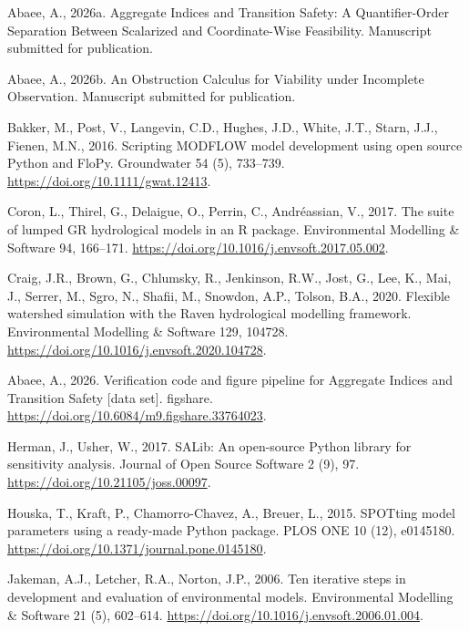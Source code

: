 \documentclass[3p,11pt]{elsarticle}
\begin{document}

\begin{thebibliography}{}
\providecommand{\natexlab}[1]{#1}

Abaee, A., 2026a. Aggregate Indices and Transition Safety: A Quantifier-Order
Separation Between Scalarized and Coordinate-Wise Feasibility. Manuscript
submitted for publication.

Abaee, A., 2026b. An Obstruction Calculus for Viability under Incomplete
Observation. Manuscript submitted for publication.


Bakker, M., Post, V., Langevin, C.D., Hughes, J.D., White, J.T., Starn,
J.J., Fienen, M.N., 2016. Scripting MODFLOW model development using open
source Python and FloPy. Groundwater 54 (5), 733--739.
\url{https://doi.org/10.1111/gwat.12413}.

Coron, L., Thirel, G., Delaigue, O., Perrin, C., Andr\'eassian, V., 2017.
The suite of lumped GR hydrological models in an R package. Environmental
Modelling \& Software 94, 166--171.
\url{https://doi.org/10.1016/j.envsoft.2017.05.002}.

Craig, J.R., Brown, G., Chlumsky, R., Jenkinson, R.W., Jost, G., Lee, K.,
 Mai, J., Serrer, M., Sgro, N., Shafii, M., Snowdon, A.P., Tolson, B.A.,
 2020. Flexible watershed simulation with the Raven hydrological modelling
 framework. Environmental Modelling \& Software 129, 104728.
 \url{https://doi.org/10.1016/j.envsoft.2020.104728}.

Abaee, A., 2026. Verification code and figure pipeline for Aggregate
Indices and Transition Safety [data set]. figshare.
\url{https://doi.org/10.6084/m9.figshare.33764023}.

Herman, J., Usher, W., 2017. SALib: An open-source Python library for
sensitivity analysis. Journal of Open Source Software 2 (9), 97.
\url{https://doi.org/10.21105/joss.00097}.

Houska, T., Kraft, P., Chamorro-Chavez, A., Breuer, L., 2015. SPOTting
model parameters using a ready-made Python package. PLOS ONE 10 (12),
e0145180. \url{https://doi.org/10.1371/journal.pone.0145180}.

Jakeman, A.J., Letcher, R.A., Norton, J.P., 2006. Ten iterative steps in
development and evaluation of environmental models. Environmental Modelling
\& Software 21 (5), 602--614. \url{https://doi.org/10.1016/j.envsoft.2006.01.004}.


\end{thebibliography}
\end{document}

